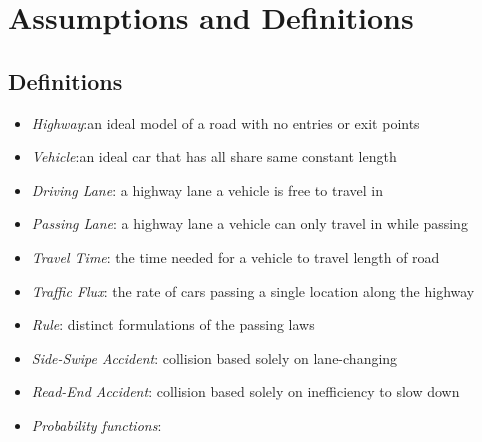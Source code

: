\documentclass{amsart}
\begin{document}
\section{\bfseries{Assumptions and Definitions}}
	\subsection{Definitions}
		\begin{itemize}
  			\item \textit{Highway}:an ideal model of a road with no entries or exit points
			\item \textit{Vehicle}:an ideal car that has all share same constant length 
			\item \textit{Driving Lane}: a highway lane a vehicle is free to travel in
  			\item \textit{Passing Lane}: a highway lane a vehicle can only travel in while passing
			\item \textit{Travel Time}: the time needed for a vehicle to travel length of road
			\item \textit{Traffic Flux}: the rate of cars passing a single location along the highway
			\item \textit{Rule}: distinct formulations of the passing laws 
			\item \textit{Side-Swipe Accident}: collision based solely on lane-changing
			\item \textit{Read-End Accident}: collision based solely on inefficiency to slow down
			\item \textit{Probability functions}: 
		\end{itemize}
	
\end{document}
